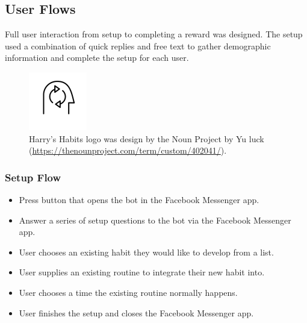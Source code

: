 \subsection{User Flows} \label{user_flow}
Full user interaction from setup to completing a reward was designed. The setup used a combination of quick replies and free text to gather demographic information and complete the setup for each user.

\begin{figure}[H]
  \centering
  \includegraphics[width=1in]{../resources/logo.png}
  \caption{Harry's Habits logo was design by the Noun Project by Yu luck (\url{https://thenounproject.com/term/custom/402041/}).}
  \label{fig:logo}
\end{figure}


\subsubsection{Setup Flow} \label{setup_flow}

\begin{itemize}
  \item Press button that opens the bot in the Facebook Messenger app.
  \item Answer a series of setup questions to the bot via the Facebook Messenger app.
  \item User chooses an existing habit they would like to develop from a list.
  \item User supplies an existing routine to integrate their new habit into.
  \item User chooses a time the existing routine normally happens.
  \item User finishes the setup and closes the Facebook Messenger app.
\end{itemize}

